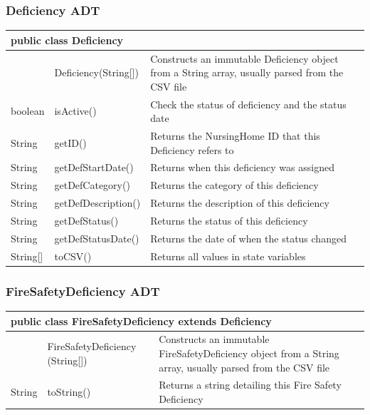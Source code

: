 \documentclass[12pt]{article}
\begin{document}
\subsubsection{Deficiency ADT}
\begin{center}
\begin{tabular}{p{0.1\hsize}|p{0.25\hsize}|p{0.50\hsize}}
\multicolumn{3}{l}{\textbf{public class Deficiency}} \\
\hline
 & Deficiency(String[]) & Constructs an immutable Deficiency object from a String array, usually parsed from the CSV file\\
\hline
boolean 	& isActive() & Check the status of deficiency and the status date \\
\hline
String 	& getID() & Returns the NursingHome ID that this Deficiency refers to\\
\hline
String 	& getDefStartDate() & Returns when this deficiency was assigned\\
\hline
String 	& getDefCategory() & Returns the category of this deficiency\\
\hline
String 	& getDefDescription() & Returns the description of this deficiency\\
\hline
String 	& getDefStatus() & Returns the status of this deficiency\\
\hline
String 	& getDefStatusDate() & Returns the date of when the status changed\\
\hline
String[] 	& toCSV() & Returns all values in state variables\\
\hline
\end{tabular}
\end{center}

\newpage

\subsubsection{FireSafetyDeficiency ADT}
\begin{center}
\begin{tabular}{p{0.1\hsize}|p{0.25\hsize}|p{0.50\hsize}}
\multicolumn{3}{l}{\textbf{public class FireSafetyDeficiency extends Deficiency}} \\
\hline
 & FireSafetyDeficiency (String[]) & Constructs an immutable FireSafetyDeficiency object from a String array, usually parsed from the CSV file\\
\hline
String	& toString() & Returns a string detailing this Fire Safety Deficiency\\
\hline
\end{tabular}
\end{center}
\end{document}
